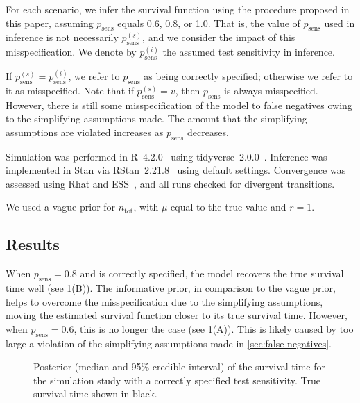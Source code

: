 \documentclass[12pt]{article}
\newcommand{\psens}{p_\text{sens}}
\newcommand{\psenss}{p_\text{sens}^{(s)}}
\newcommand{\psensi}{p_\text{sens}^{(i)}}
\newcommand{\ntot}{n_\text{tot}}
\begin{document}
For each scenario, we infer the survival function using the procedure proposed in this paper, assuming $\psens$ equals 0.6, 0.8, or 1.0.
That is, the value of $\psens$ used in inference is not necessarily $\psenss$, and we consider the impact of this misspecification.
We denote by $\psensi$ the assumed test sensitivity in inference.

If $\psenss = \psensi$, we refer to $\psens$ as being correctly specified; otherwise we refer to it as misspecified.
Note that if $\psenss = v$, then $\psens$ is always misspecified.
However, there is still some misspecification of the model to false negatives owing to the simplifying assumptions made.
The amount that the simplifying assumptions are violated increases as $\psens$ decreases.


Simulation was performed in R~4.2.0~\citep{R-4-2-0} using tidyverse~2.0.0~\citep{tidyverse}.
Inference was implemented in Stan via RStan~2.21.8~\citep{rstan2-21-8} using default settings.
Convergence was assessed using Rhat and ESS~\cite{vehtariRhat}, and all runs checked for divergent transitions.

We used a vague prior for $\ntot$, with $\mu$ equal to the true value and $r=1$.

\subsection{Results}

When $\psens = 0.8$ and is correctly specified, the model recovers the true survival time well (see \cref{imperf-test:fig:constant-test-sensitivity}(B)).
The informative prior, in comparison to the vague prior, helps to overcome the misspecification due to the simplifying assumptions, moving the estimated survival function closer to its true survival time.
However, when $\psens = 0.6$, this is no longer the case (see \cref{imperf-test:fig:constant-test-sensitivity}(A)).
This is likely caused by too large a violation of the simplifying assumptions made in \cref{sec:false-negatives}.
\begin{figure}
  \caption[Simulation study results with constant test sensitivity]{%
    Posterior (median and 95\% credible interval) of the survival time for the simulation study with a correctly specified test sensitivity.
    True survival time shown in black.
  }
  \label{imperf-test:fig:constant-test-sensitivity}
\end{figure}
\end{document}
